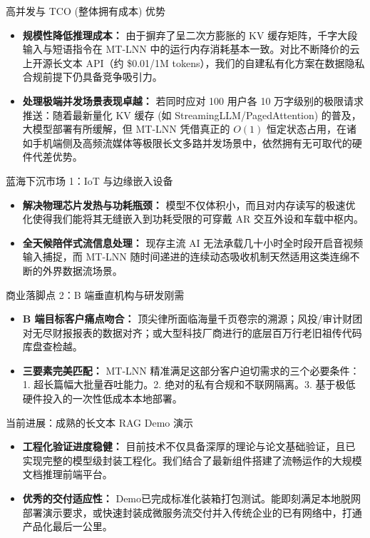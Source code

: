 ﻿\documentclass[aspectratio=169, 10pt]{beamer}
\begin{document}
\begin{frame}{高并发与 TCO (整体拥有成本) 优势}
\begin{itemize}
    \item \textbf{规模性降低推理成本：} 由于摒弃了呈二次方膨胀的 KV 缓存矩阵，千字大段输入与短语指令在 MT-LNN 中的运行内存消耗基本一致。对比不断降价的云上开源长文本 API（约 \$0.01/1M tokens），我们的自建私有化方案在数据隐私合规前提下仍具备竞争吸引力。
    \item \textbf{处理极端并发场景表现卓越：} 
        若同时应对 100 用户各 10 万字级别的极限请求推送：随着最新量化 KV 缓存 (如 StreamingLLM/PagedAttention) 的普及，大模型部署有所缓解，但 MT-LNN 凭借真正的 $O(1)$ 恒定状态占用，在诸如手机端侧及高频流媒体等极限长文多路并发场景中，依然拥有无可取代的硬件代差优势。
\end{itemize}
\end{frame}

\begin{frame}{蓝海下沉市场 1：IoT 与边缘嵌入设备}
\begin{itemize}
    \item \textbf{解决物理芯片发热与功耗瓶颈：} 模型不仅体积小，而且对内存读写的极速优化使得我们能将其无缝嵌入到功耗受限的可穿戴 AR 交互外设和车载中枢内。
    \item \textbf{全天候陪伴式流信息处理：} 现存主流 AI 无法承载几十小时全时段开启音视频输入捕捉，而 MT-LNN 随时间递进的连续动态吸收机制天然适用这类连绵不断的外界数据流场景。
\end{itemize}
\end{frame}

\begin{frame}{商业落脚点 2：B 端垂直机构与研发刚需}
\begin{itemize}
    \item \textbf{B 端目标客户痛点吻合：} 
        顶尖律所面临海量千页卷宗的溯源；风投/审计财团对无尽财报报表的数据对齐；或大型科技厂商进行的底层百万行老旧祖传代码库盘查检越。
    \item \textbf{三要素完美匹配：} MT-LNN 精准满足这部分客户迫切需求的三个必要条件：1. 超长篇幅大批量吞吐能力。2. 绝对的私有合规和不联网隔离。3. 基于极低硬件投入的一次性低成本本地部署。
\end{itemize}
\end{frame}

\begin{frame}{当前进展：成熟的长文本 RAG Demo 演示}
\begin{itemize}
    \item \textbf{工程化验证进度稳健：} 目前技术不仅具备深厚的理论与论文基础验证，且已实现完整的模型级封装工程化。我们结合了最新组件搭建了流畅运作的大规模文档推理前端平台。
    \item \textbf{优秀的交付适应性：} Demo已完成标准化装箱打包测试。能即刻满足本地脱网部署演示要求，或快速封装成微服务流交付并入传统企业的已有网络中，打通产品化最后一公里。
\end{itemize}
\end{frame}
\end{document}
